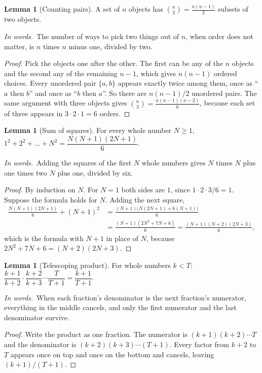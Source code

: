 \documentclass[11pt]{article}
\theoremstyle{definition}
\newtheorem{lemma}[definition]{Lemma}
\newcommand{\inwords}{\par\smallskip\noindent\textit{In words.}\ }
\begin{document}
\begin{lemma}[Counting pairs]\label{lem:pairs}
A set of $n$ objects has $\binom n2=\frac{n(n-1)}2$ subsets of two objects.
\inwords The number of ways to pick two things out of $n$, when order does not matter, is $n$ times $n$ minus one,
divided by two.
\end{lemma}
\begin{proof}
Pick the objects one after the other. The first can be any of the $n$ objects and the second any of the remaining
$n-1$, which gives $n(n-1)$ ordered choices. Every unordered pair $\{a,b\}$ appears exactly twice among them, once as
``$a$ then $b$'' and once as ``$b$ then $a$''. So there are $n(n-1)/2$ unordered pairs. The same argument with three
objects gives $\binom n3=\frac{n(n-1)(n-2)}{6}$, because each set of three appears in $3\cdot2\cdot1=6$ orders.
\end{proof}

\begin{lemma}[Sum of squares]\label{lem:sumsq}
For every whole number $N\ge1$, \quad $1^2+2^2+\dots+N^2=\dfrac{N(N+1)(2N+1)}{6}$.
\inwords Adding the squares of the first $N$ whole numbers gives $N$ times $N$ plus one times two $N$ plus one,
divided by six.
\end{lemma}
\begin{proof}
By induction on $N$. For $N=1$ both sides are $1$, since $1\cdot2\cdot3/6=1$. Suppose the formula holds for $N$. Adding
the next square,
\begin{align*} \frac{N(N+1)(2N+1)}6+(N+1)^2&=\frac{(N+1)\big(N(2N+1)+6(N+1)\big)}6\\ &=\frac{(N+1)(2N^2+7N+6)}6=\frac{(N+1)(N+2)(2N+3)}6, \end{align*}
which is the formula with $N+1$ in place of $N$, because $2N^2+7N+6=(N+2)(2N+3)$.
\end{proof}

\begin{lemma}[Telescoping product]\label{lem:telescope}
For whole numbers $k<T$: \quad $\dfrac{k+1}{k+2}\cdot\dfrac{k+2}{k+3}\cdots\dfrac{T}{T+1}=\dfrac{k+1}{T+1}$.
\inwords When each fraction's denominator is the next fraction's numerator, everything in the middle cancels, and only
the first numerator and the last denominator survive.
\end{lemma}
\begin{proof}
Write the product as one fraction. The numerator is $(k+1)(k+2)\cdots T$ and the denominator is $(k+2)(k+3)\cdots(T+1)$.
Every factor from $k+2$ to $T$ appears once on top and once on the bottom and cancels, leaving $(k+1)/(T+1)$.
\end{proof}
\end{document}
